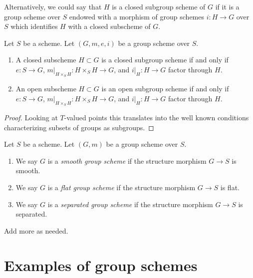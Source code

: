 \noindent
Alternatively, we could say that $H$ is a closed subgroup scheme of $G$
if it is a group scheme over $S$ endowed with a morphism of group schemes
$i : H \to G$ over $S$ which identifies $H$ with a closed subscheme of $G$.

\begin{lemma}
\label{lemma-closed-subgroup-scheme}
Let $S$ be a scheme. Let $(G, m, e, i)$ be a group scheme over $S$.
\begin{enumerate}
\item A closed subscheme $H \subset G$ is a closed subgroup scheme
if and only if $e : S \to G$, $m|_{H \times_S H} : H \times_S H \to G$,
and $i|_H : H \to G$ factor through $H$.
\item An open subscheme $H \subset G$ is an open subgroup scheme
if and only if $e : S \to G$, $m|_{H \times_S H} : H \times_S H \to G$,
and $i|_H : H \to G$ factor through $H$.
\end{enumerate}
\end{lemma}

\begin{proof}
Looking at $T$-valued points this translates into the well known
conditions characterizing subsets of groups as subgroups.
\end{proof}

\begin{definition}
\label{definition-smooth-group-scheme}
Let $S$ be a scheme. Let $(G, m)$ be a group scheme over $S$.
\begin{enumerate}
\item We say $G$ is a {\it smooth group scheme} if the structure
morphism $G \to S$ is smooth.
\item We say $G$ is a {\it flat group scheme} if the structure
morphism $G \to S$ is flat.
\item We say $G$ is a {\it separated group scheme} if the structure
morphism $G \to S$ is separated.
\end{enumerate}
Add more as needed.
\end{definition}






\section{Examples of group schemes}
\label{section-examples-group-schemes}

